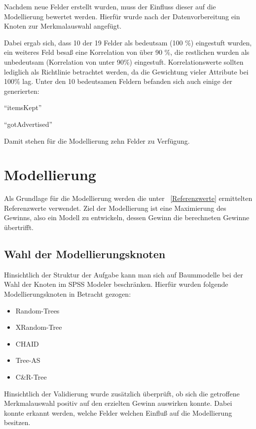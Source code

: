 \documentclass[a4paper,12pt]{article}
\begin{document}
Nachdem neue Felder erstellt wurden, muss der Einfluss dieser auf die Modellierung bewertet werden.
Hierfür wurde nach der Datenvorbereitung  ein Knoten zur Merkmalauswahl angefügt.

Dabei ergab sich, dass 10 der 19 Felder als bedeutsam (100 \%) eingestuft wurden, ein weiteres Feld besaß eine Korrelation von über 90 \%,
die restlichen wurden als unbedeutsam (Korrelation von unter 90\%) eingestuft.
Korrelationswerte sollten lediglich als Richtlinie betrachtet werden, da die Gewichtung
vieler Attribute bei 100\% lag.  Unter den 10 bedeutsamen Feldern befanden sich auch einige der
generierten:

\vspace{0.2cm}
\par
	\begin{minipage}[h]{.5\textwidth}
	\begin{center}
	"`itemsKept"'
	\end{center}
	\end{minipage}
	\hfill
	\begin{minipage}[h]{.5\textwidth}
	\begin{center}
	"`gotAdvertised"'
	\end{center}
	\end{minipage}
	\vspace{0.2cm}
\par
Damit stehen für die Modellierung zehn Felder zu Verfügung.
\section{Modellierung}
Als Grundlage für die Modellierung werden die unter ~\ref{Referenzwerte} ermittelten Referenzwerte verwendet. Ziel der Modellierung ist eine Maximierung des Gewinns, also ein Modell zu entwickeln, dessen Gewinn die berechneten Gewinne übertrifft.  
\subsection{Wahl der Modellierungsknoten}
Hinsichtlich der Struktur der Aufgabe kann man sich auf Baummodelle bei der Wahl der Knoten im SPSS Modeler beschränken. Hierfür wurden folgende Modellierungsknoten in Betracht gezogen:
\begin{itemize}
	\item Random-Trees
	\item XRandom-Tree
	\item CHAID
	\item Tree-AS
	\item C\&R-Tree
\end{itemize} 
Hinsichtlich der Validierung wurde zusätzlich überprüft, ob sich die getroffene Merkmalauswahl positiv auf den erzielten Gewinn auswirken konnte. Dabei konnte erkannt werden, welche Felder welchen Einfluß auf die Modellierung besitzen.
\end{document}
